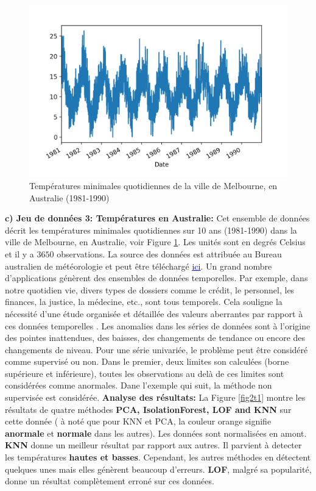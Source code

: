 \begin{figure}[H]
    \centering
    \includegraphics[width=.5\textwidth]{ADOA/Images/Temp1.png}
    \caption{Températures minimales quotidiennes de la ville de Melbourne, en Australie (1981-1990)}%
    \label{fig2t}
\end{figure}
\noindent\textbf{c) Jeu de données 3: Températures en Australie:}
Cet ensemble de données décrit les températures minimales quotidiennes sur 10 ans (1981-1990) dans la ville de Melbourne, en Australie, voir Figure \ref{fig2t}. Les unités sont en degrés Celsius et il y a $3650$ observations. La source des données est attribuée au Bureau australien de météorologie et peut être téléchargé \href{https://machinelearningmastery.com/time-series-data-visualization-with-python/}{\textcolor{blue}{\underline{ici}}}. Un grand nombre d'applications génèrent des ensembles de données temporelles. Par exemple, dans notre quotidien vie, divers types de dossiers comme le crédit, le personnel, les finances, la justice, la médecine, etc., sont tous temporels. Cela souligne la nécessité d'une étude organisée et détaillée des valeurs aberrantes par rapport à ces données temporelles \cite{A5}. Les anomalies dans les séries de données  sont à l'origine des pointes inattendues, des baisses, des changements de tendance ou encore des changements de niveau. Pour une série univariée, le problème peut être considéré comme supervisé ou non. Dans le premier, deux limites son calculées (borne supérieure et inférieure), toutes les observations au delà de ces limites sont considérées comme anormales. Dane l'exemple qui suit, la méthode non supervisée est considérée. \newl
\noindent\textbf{Analyse des résultats:} 
La Figure \eqref{fig2t1} montre les résultats de quatre méthodes \textbf{PCA, IsolationForest, LOF and KNN} sur cette donnée ( à noté que pour KNN et PCA, la couleur orange signifie \textbf{anormale} et \textbf{normale} dans les autres). Les données sont normalisées en amont. \textbf{KNN} donne un meilleur résultat par rapport aux autres. Il parvient à detecter les températures \textbf{hautes et basses}. Cependant, les autres méthodes en détectent quelques unes mais elles génèrent beaucoup d'erreurs. \textbf{LOF}, malgré sa popularité, donne un résultat complètement erroné sur ces données. 

